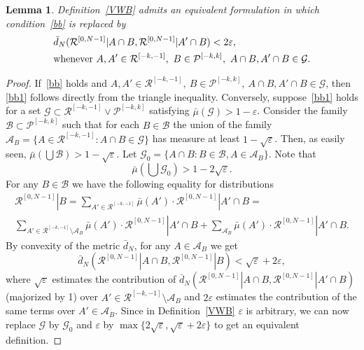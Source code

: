 \documentclass[10pt,a4paper]{amsart}
\newtheorem{lem}{Lemma}
\def \A {\mathcal A}
\def \B {\mathcal B}
\def \G {\mathcal G}
\def \P {\mathcal P}
\def \R {\mathcal R}
\def \eps {\varepsilon}
\begin{document}
\begin{lem}\label{over}
Definition~\ref{VWB} admits an equivalent formulation in which condition~\eqref{bb} is replaced by
\begin{align}
&\bar d_N(\R^{[0,N-1]}|A\cap B, \R^{[0,N-1]}|A'\cap B)<2\eps,\label{bb1}\\ 
&\text{whenever }A,A'\in\R^{[-k,-1]},\ B\in\P^{[-k,k]},\ A\cap B,A'\cap B\in\G.\notag
\end{align}
\end{lem}

\begin{proof}
If~\eqref{bb} holds and $A,A'\in\R^{[-k,-1]},\ B\in\P^{[-k,k]},\ A\cap B,A'\cap B\in\G$, then \eqref{bb1} follows directly from the triangle inequality. Conversely, suppose~\eqref{bb1} holds for a set
$\G\subset\R^{[-k,-1]}\vee\P^{[-k,k]}$ satisfying $\bar\mu(\G)>1-\eps$. Consider the family $\B\subset\P^{[-k,k]}$ such that for each $B\in\B$ the union of the family $\A_B=\{A\in\R^{[-k,-1]}:A\cap B\in\G\}$ has measure at least $1-\sqrt\eps$. Then, as easily seen, $\bar\mu(\bigcup\B)>1-\sqrt\eps$. Let $\G_0 = \{A\cap B:B\in\B,A\in\A_B\}$.
Note that 
\begin{equation}\label{aax}\tag{7a}
\bar\mu(\bigcup\G_0)>1-2\sqrt\eps.
\end{equation}For any $B\in\B$ we have the following  equality for distributions 
\begin{multline*}
\R^{[0,N-1]}|B = \sum_{A'\in\R^{[-k,-1]}}\bar\mu(A')\cdot\R^{[0,N-1]}|A'\cap B=\\
\sum_{A'\in\R^{[-k,-1]}\setminus\A_B}\bar\mu(A')\cdot\R^{[0,N-1]}|A'\cap B +
\sum_{\A_B}\bar\mu(A')\cdot\R^{[0,N-1]}|A'\cap B.
\end{multline*}
By convexity of the metric $\bar d_N$, for any $A\in\A_B$ we get
\begin{equation}\label{aa1}\tag{8a}
\bar d_N(\R^{[0,N-1]}|A\cap B, \R^{[0,N-1]}|B)<\sqrt\eps + 2\eps,
\end{equation}
where $\sqrt\eps$ estimates the contribution of $\bar d_N(\R^{[0,N-1]}|A\cap B, \R^{[0,N-1]}|A'\cap B)$ (majorized by 1) over $A'\in\R^{[-k,-1]}\setminus\A_B$ and $2\eps$ estimates the contribution of the same terms over $A'\in\A_B$. Since in Definition~\ref{VWB} $\eps$ is arbitrary, we can now replace $\G$ by $\G_0$ and $\eps$ by $\max\{2\sqrt\eps,\sqrt\eps+2\eps\}$ to get an equivalent definition. 
\end{proof}
\end{document}
